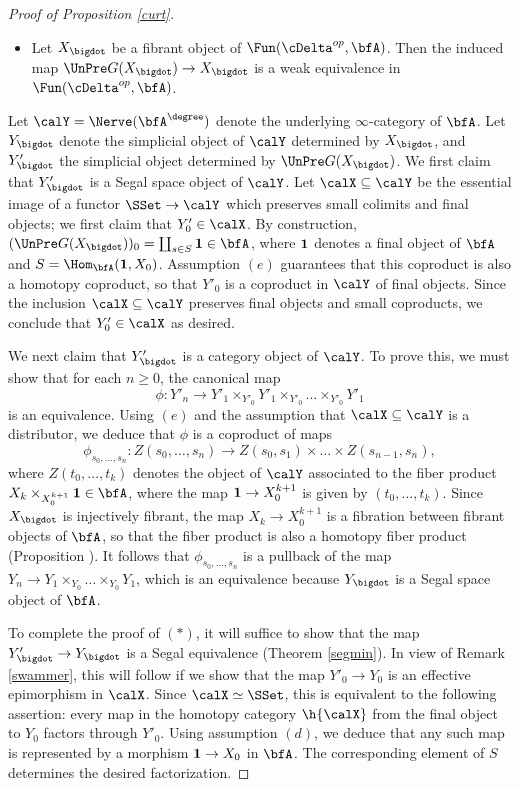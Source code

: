 \begin{proof}[Proof of Proposition \ref{curt}]
\begin{itemize}
\item[$(\ast)$] Let $X_{\bigdot}$ be a fibrant object of $\Fun( \cDelta^{op}, \bfA)$.
Then the induced map $\UnPre G(X_{\bigdot}) \rightarrow X_{\bigdot}$ is
a weak equivalence in $\Fun( \cDelta^{op}, \bfA)$. 
\end{itemize}

Let $\calY = \Nerve( \bfA^{\degree} )$ denote the underlying $\infty$-category of
$\bfA$. Let $Y_{\bigdot}$ denote the simplicial object of $\calY$ determined
by $X_{\bigdot}$, and $Y'_{\bigdot}$ the simplicial object determined by
$\UnPre G(X_{\bigdot})$. We first claim that $Y'_{\bigdot}$ is a Segal space object
of $\calY$. Let $\calX \subseteq \calY$ be the essential image of a functor
$\SSet \rightarrow \calY$ which preserves small colimits and final objects;
we first claim that $Y'_0 \in \calX$. By construction, $(\UnPre G(X_{\bigdot}))_0
= \coprod_{s \in S} {\bf 1} \in \bfA$, where ${\bf 1}$ denotes a final object
of $\bfA$ and $S = \Hom_{\bfA}( {\bf 1}, X_0)$. Assumption
$(e)$ guarantees that this coproduct is also a homotopy coproduct, so that
$Y'_0$ is a coproduct in $\calY$ of final objects. Since the inclusion
$\calX \subseteq \calY$ preserves final objects and small coproducts, we conclude
that $Y'_0 \in \calX$ as desired.

We next claim that $Y'_{\bigdot}$ is a category object of $\calY$. To prove this, we must show
that for each $n \geq 0$, the canonical map
$$ \phi: Y'_n \rightarrow Y'_1 \times_{Y'_0} Y'_1 \times_{Y'_0} \ldots \times_{Y'_0} Y'_1$$
is an equivalence. Using $(e)$ and the assumption that $\calX \subseteq \calY$
is a distributor, we deduce that $\phi$ is a coproduct of maps
$$ \phi_{s_0, \ldots, s_n}: Z(s_0, \ldots, s_n) \rightarrow Z(s_0, s_1) \times \ldots
\times Z(s_{n-1}, s_n),$$
where $Z(t_0, \ldots, t_k)$ denotes the object of $\calY$ associated
to the fiber product $X_{k} \times_{ X_0^{k+1}} {\bf 1} \in \bfA$,
where the map ${\bf 1} \rightarrow X_0^{k+1}$ is given by $(t_0, \ldots, t_k)$.
Since $X_{\bigdot}$ is injectively fibrant, the map $X_k \rightarrow X_0^{k+1}$
is a fibration between fibrant objects of $\bfA$, so that the fiber
product is also a homotopy fiber product (Proposition ).
It follows that $\phi_{s_0, \ldots, s_n}$ is a pullback of the map $Y_{n} \rightarrow Y_1 \times_{Y_0} \ldots \times_{Y_0} Y_1$, which is an equivalence because $Y_{\bigdot}$ is a Segal
space object of $\bfA$.

To complete the proof of $(\ast)$, it will suffice to show that the map $Y'_{\bigdot} \rightarrow Y_{\bigdot}$ is a Segal equivalence (Theorem \ref{segmin}). In view of Remark \ref{swammer}, this will follow
if we show that the map $Y'_0 \rightarrow Y_0$ is an effective epimorphism in $\calX$.
Since $\calX \simeq \SSet$, this is equivalent to the following assertion: every map 
in the homotopy category $\h{\calX}$ from the final object to $Y_0$ factors through $Y'_0$.
Using assumption $(d)$, we deduce that any such map is represented by a morphism
${\bf 1} \rightarrow X_0$ in $\bfA$. The corresponding element of $S$ determines the desired
factorization.
\end{proof}

